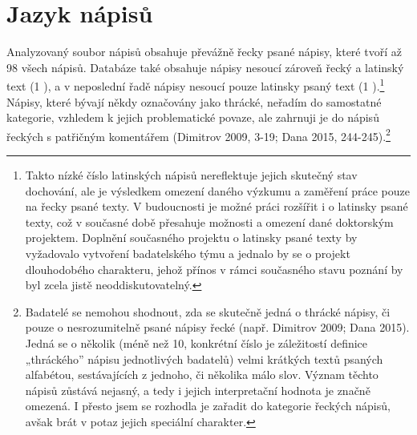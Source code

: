 
\section[jazyk-nápisů]{Jazyk nápisů}

Analyzovaný soubor nápisů obsahuje převážně řecky psané nápisy, které tvoří až 98  všech nápisů. Databáze také obsahuje nápisy nesoucí zároveň řecký a latinský text (1 ), a v neposlední řadě nápisy nesoucí pouze latinsky psaný text (1 ).\footnote{Takto nízké číslo latinských nápisů nereflektuje jejich skutečný stav dochování, ale je výsledkem omezení daného výzkumu a zaměření práce pouze na řecky psané texty. V budoucnosti je možné práci rozšířit i o latinsky psané texty, což v současné době přesahuje možnosti a omezení dané doktorským projektem. Doplnění současného projektu o latinsky psané texty by vyžadovalo vytvoření badatelského týmu a jednalo by se o projekt dlouhodobého charakteru, jehož přínos v rámci současného stavu poznání by byl zcela jistě neoddiskutovatelný.} Nápisy, které bývají někdy označovány jako thrácké, neřadím do samostatné kategorie, vzhledem k jejich problematické povaze, ale zahrnuji je do nápisů řeckých s patřičným komentářem (Dimitrov 2009, 3-19; Dana 2015, 244-245).\footnote{Badatelé se nemohou shodnout, zda se skutečně jedná o thrácké nápisy, či pouze o nesrozumitelně psané nápisy řecké (např. Dimitrov 2009; Dana 2015). Jedná se o několik (méně než 10, konkrétní číslo je záležitostí definice „thráckého” nápisu jednotlivých badatelů) velmi krátkých textů psaných alfabétou, sestávajících z jednoho, či několika málo slov. Význam těchto nápisů zůstává nejasný, a tedy i jejich interpretační hodnota je značně omezená. I přesto jsem se rozhodla je zařadit do kategorie řeckých nápisů, avšak brát v potaz jejich speciální charakter.}

